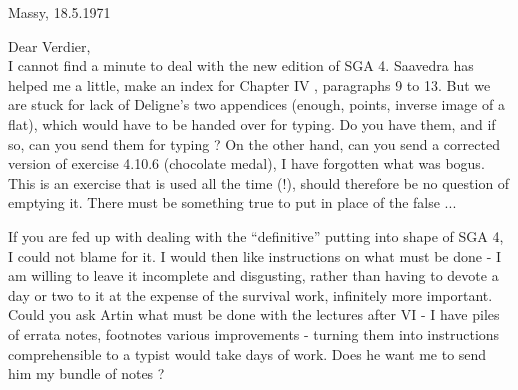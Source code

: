 \begin{flushright}
Massy, 18.5.1971\\
\end{flushright}
Dear Verdier,\\

I cannot find a minute to deal with the new edition of SGA 4. Saavedra has helped me a little,  make an index for Chapter IV , paragraphs 9 to 13. But we are stuck for lack of Deligne's two appendices (enough, points, inverse image of a flat), which would have to be handed over for typing. Do you have them, and if so, can you send them for typing ? On the other hand, can you send a corrected version of exercise 4.10.6 (chocolate medal), I have  forgotten what was bogus. This is an exercise that is used all the time (!),  should therefore be no question of emptying it. There must be something true to put in place of the false ...

If you are fed up with dealing with the ``definitive'' putting into shape of SGA 4, I could not blame  for it. I would then like instructions on what must be done - I am willing to leave it incomplete and disgusting, rather than having to  devote a day or two to it at the expense of the survival work, infinitely more important. Could you ask Artin what must be done with the lectures after VI - I have piles of errata notes, footnotes various improvements - turning them into instructions comprehensible to a typist would take days of work. Does he want me to send him my bundle of notes ?
